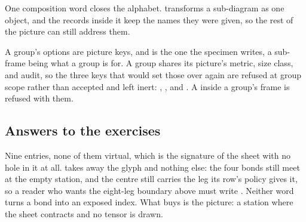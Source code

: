 One composition word closes the alphabet.   transforms a
sub-diagram as one object, and the records inside it keep the names they
were given, so the rest of the picture can still address them.

\begin{tnexample}[
  caption={a grouped sub-diagram},
  index={The group is one object of its picture.  Its member keeps the
    name \tnval{g} and is reachable from outside the group by that name.},
  signature={kernel-boundary|signature=}]
\begin{tenkz}[rows={ket}, cols=1, bonds=none]
\end{tenkz}
\end{tnexample}

A group's options are picture keys, and  is the one the
specimen writes, a sub-frame being what a group is for.  A group shares
its picture's metric, size class, and audit, so the three keys that would
set those over again are refused at group scope rather than accepted and
left inert: , , and .  A
 inside a group's frame is refused with them.

\subsection{Answers to the exercises}

 Nine entries, none of them virtual, which is the
signature of the sheet with no hole in it at all.   takes
away the glyph and nothing else: the four bonds still meet at the empty
station, and the centre still carries the leg its row's policy gives it,
so a reader who wants the eight-leg boundary above must write
.  Neither word turns a bond into an exposed index.  What
 buys is the picture: a station where the sheet contracts and
no tensor is drawn.
